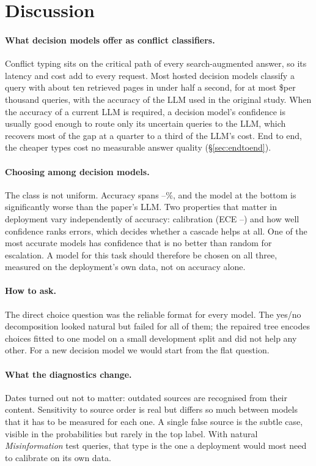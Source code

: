 \section{Discussion}
\label{sec:discussion}

\paragraph{What decision models offer as conflict classifiers.} Conflict typing sits on the critical path of every
search-augmented answer, so its latency and cost add to every request. Most hosted decision models classify a query
with about ten retrieved pages in under half a second, for at most \$\dmcostmax per thousand queries, with the accuracy of the LLM used in the original study. When the accuracy of a
current LLM is required, a decision model's confidence is usually good enough to route only its uncertain queries to
the LLM, which recovers most of the gap at a quarter to a third of the LLM's cost. End to end, the cheaper types cost
no measurable answer quality (\S\ref{sec:endtoend}). 

\paragraph{Choosing among decision models.} The class is not uniform. Accuracy spans \dmaccmin--\dmaccmax\%, and the
model at the bottom is significantly worse than the paper's LLM. Two properties that matter in deployment vary
independently of accuracy: calibration (ECE \eceminimum--\ecemaximum) and how well confidence ranks errors, which
decides whether a cascade helps at all. One of the most accurate models has confidence that is no better than random for
escalation. A model for this task should therefore be chosen on all three, measured on the deployment's own data,
not on accuracy alone.

\paragraph{How to ask.} The direct choice question was the reliable format for every model. The yes/no
decomposition looked natural but failed for all of them; the repaired tree encodes choices fitted to one model on a
small development split and did not help any other. For a new decision model we would start from the flat
question.

\paragraph{What the diagnostics change.} Dates turned out not to matter: outdated sources are recognised
from their content. Sensitivity to source order is real but differs so much between models that it has to be
measured for each one. A single false source is the subtle case, visible in the probabilities but rarely in the
top label. With
\nmisitest natural \emph{Misinformation} test queries, that type is the one a deployment would most need to
calibrate on its own data.

